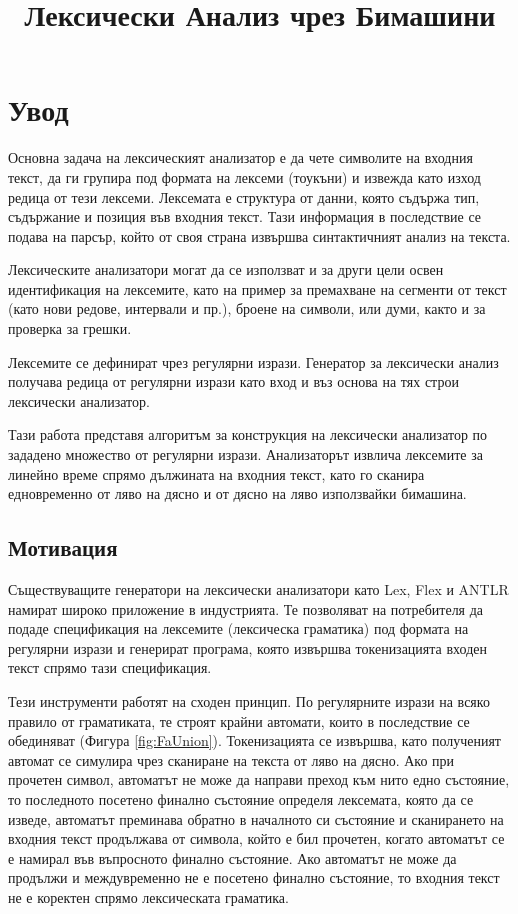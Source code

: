 \documentclass[12pt, oneside]{article}
\title{Лексически Анализ чрез Бимашини}
\theoremstyle{definition}
\begin{document}
\tableofcontents

\pagebreak
\section{Увод}

Основна задача на лексическият анализатор е да чете символите на входния текст, да ги групира под формата на лексеми (тоукъни) и извежда като изход редица от тези лексеми. Лексемата е структура от данни, която съдържа тип, съдържание и позиция във входния текст. Тази информация в последствие се подава на парсър, който от своя страна извършва синтактичният анализ на текста.

Лексическите анализатори могат да се използват и за други цели освен идентификация на лексемите, като на пример за премахване на сегменти от текст (като нови редове, интервали и пр.), броене на символи, или думи, както и за проверка за грешки.

Лексемите се дефинират чрез регулярни изрази. Генератор за лексически анализ получава редица от регулярни изрази като вход и въз основа на тях строи лексически анализатор.

Тази работа представя алгоритъм за конструкция на лексически анализатор по зададено множество от регулярни изрази. Анализаторът извлича лексемите за линейно време спрямо дължината на входния текст, като го сканира едновременно от ляво на дясно и от дясно на ляво използвайки бимашина.


\subsection{Мотивация}

Съществуващите генератори на лексически анализатори като Lex, Flex и ANTLR намират широко приложение в индустрията. Те позволяват на потребителя да подаде спецификация на лексемите (лексическа граматика) под формата на регулярни изрази и генерират програма, която извършва токенизацията входен текст спрямо тази спецификация.

Тези инструменти работят на сходен принцип. По регулярните изрази на всяко правило от граматиката, те строят крайни автомати, които в последствие се обединяват (Фигура \ref{fig:FaUnion}). Токенизацията се извършва, като полученият автомат се симулира чрез сканиране на текста от ляво на дясно. 
Ако при прочетен символ, автоматът не може да направи преход към нито едно състояние, то последното посетено финално състояние определя лексемата, която да се изведе, автоматът преминава обратно в началното си състояние и сканирането на входния текст продължава от символа, който е бил прочетен, когато автоматът се е намирал във въпросното финално състояние. Ако автоматът не може да продължи и междувременно не е посетено финално състояние, то входния текст не е коректен спрямо лексическата граматика.
\end{document}
